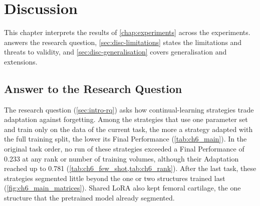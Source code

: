 %

\chapter{Discussion}
\label{chap:discussion}

This chapter interprets the results of \cref{chap:experiments} across the experiments.
 answers the research question, \cref{sec:disc-limitations} states the limitations and threats to validity, and \cref{sec:disc-generalisation} covers generalisation and extensions.

\section{Answer to the Research Question}
\label{sec:disc-rq}

The research question (\cref{sec:intro-rq}) asks how continual-learning strategies trade adaptation against forgetting.
Among the strategies that use one parameter set and train only on the data of the current task, the more a strategy adapted with the full training split, the lower its Final Performance (\cref{tab:ch6_main}).
In the original task order, no run of these strategies exceeded a Final Performance of 0.233 at any rank or number of training volumes, although their Adaptation reached up to 0.781 (\cref{tab:ch6_few_shot,tab:ch6_rank}).
After the last task, these strategies segmented little beyond the one or two structures trained last (\cref{fig:ch6_main_matrices}).
Shared LoRA also kept femoral cartilage, the one structure that the pretrained model already segmented.

